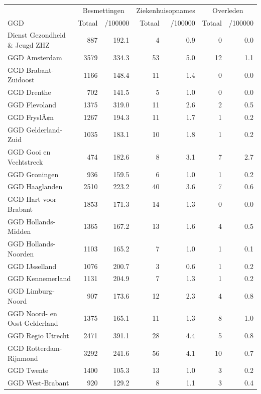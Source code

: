 \documentclass[
  english,
  man,floatsintext]{apa6}
\begin{document}
\begin{table}
\centering\begingroup\fontsize{10}{12}\selectfont

\begin{threeparttable}
\begin{tabular}{lrrrrrr}
\toprule
\multicolumn{1}{c}{ } & \multicolumn{2}{c}{Besmettingen} & \multicolumn{2}{c}{Ziekenhuisopnames} & \multicolumn{2}{c}{Overleden} \\
\cmidrule(l{3pt}r{3pt}){2-3} \cmidrule(l{3pt}r{3pt}){4-5} \cmidrule(l{3pt}r{3pt}){6-7}
GGD & Totaal & /100000 & Totaal & /100000 & Totaal & /100000\\
\midrule
Dienst Gezondheid \& Jeugd ZHZ & 887 & 192.1 & 4 & 0.9 & 0 & 0.0\\
GGD Amsterdam & 3579 & 334.3 & 53 & 5.0 & 12 & 1.1\\
GGD Brabant-Zuidoost & 1166 & 148.4 & 11 & 1.4 & 0 & 0.0\\
GGD Drenthe & 702 & 141.5 & 5 & 1.0 & 0 & 0.0\\
GGD Flevoland & 1375 & 319.0 & 11 & 2.6 & 2 & 0.5\\
GGD FryslÃ¢n & 1267 & 194.3 & 11 & 1.7 & 1 & 0.2\\
GGD Gelderland-Zuid & 1035 & 183.1 & 10 & 1.8 & 1 & 0.2\\
GGD Gooi en Vechtstreek & 474 & 182.6 & 8 & 3.1 & 7 & 2.7\\
GGD Groningen & 936 & 159.5 & 6 & 1.0 & 1 & 0.2\\
GGD Haaglanden & 2510 & 223.2 & 40 & 3.6 & 7 & 0.6\\
GGD Hart voor Brabant & 1853 & 171.3 & 14 & 1.3 & 0 & 0.0\\
GGD Hollands-Midden & 1365 & 167.2 & 13 & 1.6 & 4 & 0.5\\
GGD Hollands-Noorden & 1103 & 165.2 & 7 & 1.0 & 1 & 0.1\\
GGD IJsselland & 1076 & 200.7 & 3 & 0.6 & 1 & 0.2\\
GGD Kennemerland & 1131 & 204.9 & 7 & 1.3 & 1 & 0.2\\
GGD Limburg-Noord & 907 & 173.6 & 12 & 2.3 & 4 & 0.8\\
GGD Noord- en Oost-Gelderland & 1375 & 165.1 & 11 & 1.3 & 8 & 1.0\\
GGD Regio Utrecht & 2471 & 391.1 & 28 & 4.4 & 5 & 0.8\\
GGD Rotterdam-Rijnmond & 3292 & 241.6 & 56 & 4.1 & 10 & 0.7\\
GGD Twente & 1400 & 105.3 & 13 & 1.0 & 3 & 0.2\\
GGD West-Brabant & 920 & 129.2 & 8 & 1.1 & 3 & 0.4\\

\end{tabular}
\end{threeparttable}
\end{table}
\end{document}
